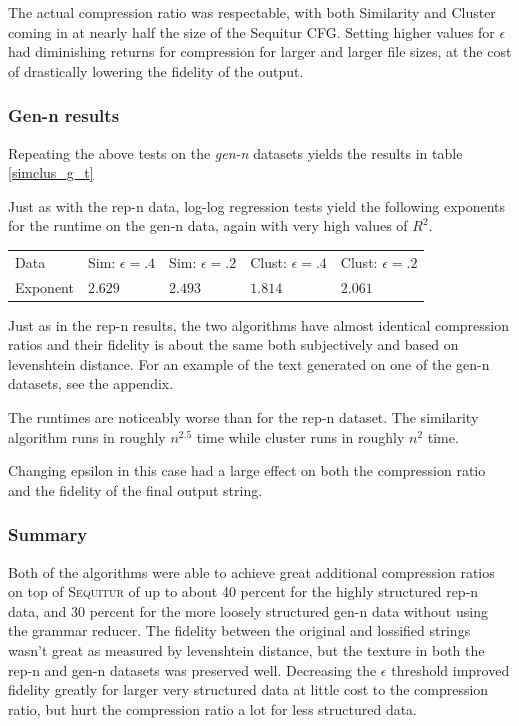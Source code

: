 \documentclass[11pt]{article}
\newcommand{\Sequitur}{\textsc{Sequitur}\xspace}
\begin{document}
The actual compression ratio was respectable, with both
Similarity and Cluster coming in at nearly half the size of the Sequitur CFG.
Setting higher values for $\epsilon$ had diminishing returns for compression
for larger and larger file sizes, at the cost of drastically lowering the fidelity
of the output. 

\subsubsection{Gen-n results}

Repeating the above tests on the \emph{gen-n} datasets yields the results in table
\ref{simclus_g_t}


Just as with the rep-n data, log-log regression tests yield the following
exponents for the runtime on the gen-n data, again with very high values of
$R^2$.

\begin{tabular}{l|l|l|l|l}
Data     & Sim: $\epsilon=.4$ & Sim: $\epsilon=.2$ & Clust: $\epsilon = .4$ & Clust: $\epsilon = .2$ \\
Exponent & $2.629$ & $2.493$ & $1.814$ & $2.061$
\end{tabular}


Just as in the rep-n results, the two algorithms have 
almost identical compression ratios and
their fidelity is about the same both subjectively and based on levenshtein
distance. For an example of the text generated on one of the gen-n datasets,
see the appendix.

The runtimes are noticeably worse than for the rep-n dataset. The
similarity algorithm runs in roughly $n^{2.5}$ time while cluster
runs in roughly $n^2$ time. 

Changing epsilon in this case had a large effect on both the compression
ratio and the fidelity of the final output string.

\subsubsection{Summary}

Both of the algorithms were able to achieve great additional compression
ratios on top of \Sequitur of up to about 40 percent for the highly
structured rep-n data, and 30 percent for the more loosely structured
gen-n data without using the grammar reducer. The fidelity between
the original and lossified strings wasn't great as measured by
levenshtein distance, but the texture in both the rep-n and
gen-n datasets was preserved well. Decreasing the $\epsilon$ threshold
improved fidelity greatly for larger very structured data at little
cost to the compression ratio, but hurt the compression ratio
a lot for less structured data.
\end{document}
